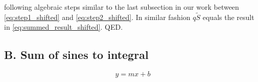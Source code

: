 \documentclass[11pt]{article}
\begin{document}
following algebraic steps similar to the last subsection in our work between \eqref{eq:step1_shifted} and \eqref{eq:step2_shifted}. In similar fashion $q\tilde{S}$ equals the result in \eqref{eq:summed_result_shifted}. QED.

\subsection*{B. Sum of sines to integral}
\label{subsec:sum_to_int}

\renewcommand{\theequation}{B.\arabic{equation}}
\begin{equation}
y = mx+b
\end{equation}
\end{document}
